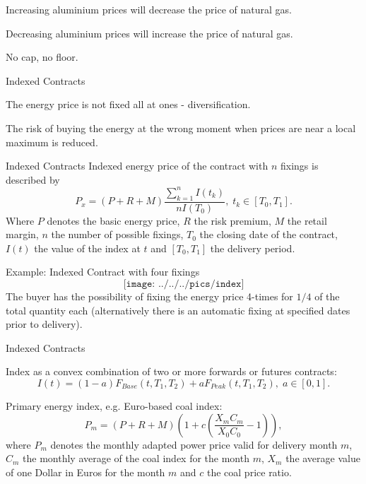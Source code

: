 



	Increasing aluminium prices will decrease the price of natural gas.


	Decreasing aluminium prices will increase the price of natural gas.


	No cap, no floor.





{Indexed Contracts}






	The energy price is not fixed all at ones - diversification.


	The risk of buying the energy at the wrong moment when prices are near a local maximum is reduced.





{Indexed Contracts}
Indexed energy price of the contract with $n$ fixings is described by
$$P_x=(P+R+M)\frac{\sum_{k=1}^n{I(t_k)}}{nI(T_0)},\;t_k\in[T_0,T_1].$$
Where $P$ denotes the basic energy price, $R$ the risk premium, $M$ the retail margin, $n$ the number of possible fixings,
$T_0$ the closing date of the contract, $I(t)$ the value of the index at $t$ and $[T_0,T_1]$ the delivery period.

{Example: Indexed Contract with four fixings}
$$\texttt{[image: ../../../pics/index]}$$
The buyer has the possibility of fixing the energy price 4-times for $1/4$ of the total quantity each (alternatively there is an automatic fixing at specified dates prior to delivery).

{Indexed Contracts}






	Index as a convex combination of two or more forwards or futures contracts:
  $$I(t)=(1-a)F_{Base}(t,T_1,T_2)+aF_{Peak}(t,T_1,T_2),\;a\in[0,1].$$


	Primary energy index, e.g. Euro-based coal index:
  $$P_m=(P+R+M)\left(1+c\left(\frac{X_mC_m}{X_0C_0}-1\right)\right),$$
  where $P_m$ denotes the monthly adapted power price valid for delivery month $m$, $C_m$ the monthly average of the coal index for the month $m$, $X_m$ the average value of one Dollar in Euros for the month $m$ and $c$ the coal price ratio.




